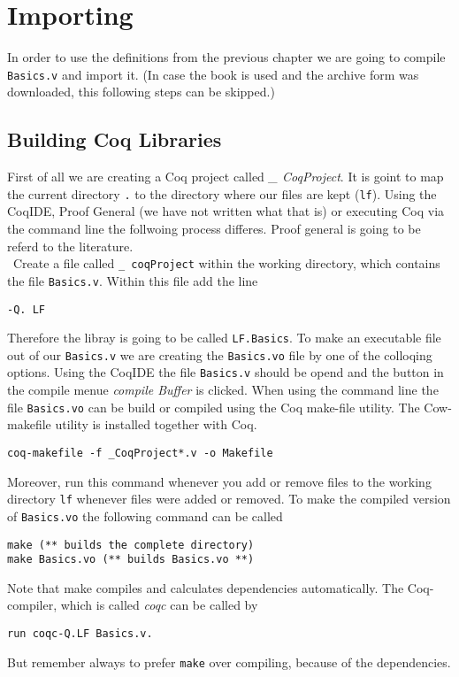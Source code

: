 \section{Importing}


In order to use the definitions from the previous chapter we are going to compile 
\texttt{Basics.v} and import it.
(In case the book \label{•} is used and the archive form was downloaded, this following steps can be skipped.)   

\subsection{Building Coq Libraries}

First of all we are creating a Coq project called {\itshape \_ CoqProject}.  
It is goint to map the current directory \texttt{.} to the directory where our files are kept (\texttt{lf}).
Using the CoqIDE, Proof General (we have not written what that is) or executing Coq via the command line the follwoing process differes.
Proof general is going to be referd to the literature.\\\
Create a file called \texttt{\_ coqProject} within the working directory, which contains the file \texttt{Basics.v}.
Within this file add the line 

\begin{lstlisting}
-Q. LF
\end{lstlisting}

Therefore the libray is going to be called \texttt{LF.Basics}. 
To make an executable file out of our \texttt{Basics.v} we are creating the \texttt{Basics.vo} file by one of the colloqing options.
Using the CoqIDE the file \texttt{Basics.v} should be opend and the button in the compile menue {\itshape compile Buffer} is clicked.
When using the command line the file \texttt{Basics.vo} can be build or compiled using the Coq  make-file utility.
The Cow-makefile utility is installed together with Coq.

\begin{lstlisting}
coq-makefile -f _CoqProject*.v -o Makefile
\end{lstlisting}

Moreover, run this command whenever you add or remove files to the  working directory  \texttt{lf} whenever files were added or removed.
To make the compiled version of \texttt{Basics.vo} the following command can be called
\begin{lstlisting}
make (** builds the complete directory)
make Basics.vo (** builds Basics.vo **)
\end{lstlisting}
Note that make compiles and calculates dependencies automatically. 
The Coq-compiler, which is called {\itshape coqc} can be called by 
\begin{lstlisting}
run coqc-Q.LF Basics.v.
\end{lstlisting}
But remember always to prefer \texttt{make} over compiling, because of the dependencies.\\
 
